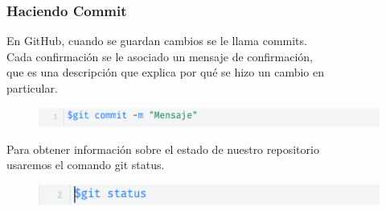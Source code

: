 \begin{frame}[fragile]
    \frametitle{Haciendo Commit}
    En GitHub, cuando se guardan cambios se le llama \alert{commits}.\\
    Cada confirmaci\'on se le asociado un mensaje de confirmaci\'on, \\
    que es una descripci\'on que explica por qué se hizo un cambio en\\
    particular.
    \begin{figure}
        \includegraphics[width=1\textwidth]{Images/11.png}
    \end{figure}
    Para obtener informaci\'on sobre el estado de nuestro repositorio\\
    usaremos el comando \alert{git status}.
    \begin{figure}
        \includegraphics[width=1\textwidth]{Images/12.png}
   \end{figure}
\end{frame}
